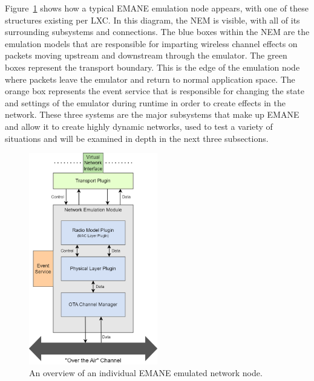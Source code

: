 Figure~\ref{emane_diagram} shows how a typical EMANE emulation node appears, with one of these structures existing per LXC.
In this diagram, the NEM is visible, with all of its surrounding subsystems and connections.
The blue boxes within the NEM are the emulation models that are responsible for imparting wireless channel effects on packets moving upstream and downstream through the emulator.
The green boxes represent the transport boundary. This is the edge of the emulation node where packets leave the emulator and return to normal application space.
The orange box represents the event service that is responsible for changing the state and settings of the emulator during runtime in order to create effects in the network.
These three systems are the major subsystems that make up EMANE and allow it to create highly dynamic networks, used to test a variety of situations and will be examined in depth in the next three subsections.

\begin{figure}[!ht]
    \centering
    \includegraphics[width=0.5\textwidth,keepaspectratio]{Images/Chpt2/emane_diagram.png}
    \caption{An overview of an individual EMANE emulated network node.}
    \label{emane_diagram}
\end{figure}


